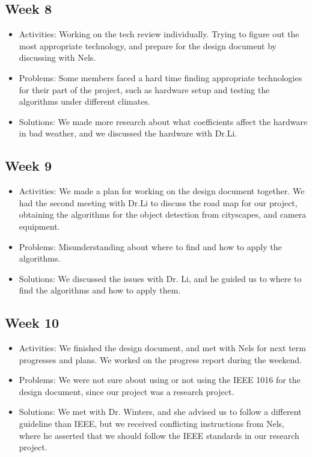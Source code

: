 \documentclass[10pt,draftclsnofoot,onecolumn,journal,compsoc]{IEEEtran}
\begin{document}
\subsection{Week 8}
\begin{itemize}
\item Activities: 
Working on the tech review individually. 
Trying to figure out the most appropriate technology, and prepare for the design document by discussing with Nels.
\item Problems: 
Some members faced a hard time finding appropriate technologies for their part of the project, such as hardware setup and testing the algorithms under different climates.
\item Solutions: 
We made more research about what coefficients affect the hardware in bad weather, and we discussed the hardware with Dr.Li.
\end{itemize}

\subsection{Week 9}
\begin{itemize}
\item Activities: 
We made a plan for working on the design document together. We had the second meeting with Dr.Li to discuss the road map for our project, obtaining the algorithms for the object detection from cityscapes, and camera equipment.
\item Problems: 
Misunderstanding about where to find and how to apply the algorithms. 
\item Solutions: 
We discussed the issues with Dr. Li, and he guided us to where to find the algorithms and how to apply them. 
\end{itemize}

\subsection{Week 10}
\begin{itemize}
\item Activities: 
We finished the design document, and met with Nels for next term progresses and plans. We worked on the progress report during the weekend.
\item Problems: 
We were not sure about using or not using the IEEE 1016 for the design document, since our project was a research project.
\item Solutions: 
We met with Dr. Winters, and she advised us to follow a different guideline than IEEE, but we received conflicting instructions from Nels, where he asserted that we should follow the IEEE standards in our research project.
\end{itemize}
\end{document}

